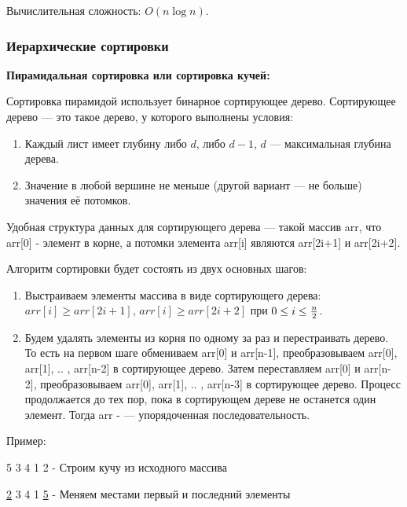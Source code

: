 \documentclass[12pt]{matmex-diploma}
\begin{document}
            Вычислительная сложность: $O(n \log n)$.
            
        \subsubsection*{Иерархические сортировки}
            
            \textbf{Пирамидальная сортировка или сортировка кучей:}
            
            Сортировка пирамидой использует бинарное сортирующее дерево. Сортирующее дерево — это такое дерево, у которого выполнены условия:
            \begin{enumerate}
                \item Каждый лист имеет глубину либо $d$, либо $d-1$, $d$ — максимальная глубина дерева.
                \item Значение в любой вершине не меньше (другой вариант — не больше) значения её потомков.
            \end{enumerate}
            
            Удобная структура данных для сортирующего дерева — такой массив arr, что arr[0] - элемент в корне, а потомки элемента arr[i] являются arr[2i+1] и arr[2i+2].
            
            Алгоритм сортировки будет состоять из двух основных шагов:
            \begin{enumerate}
                \item Выстраиваем элементы массива в виде сортирующего дерева: $arr[i] \geq arr[2i+1]$, $arr[i] \geq arr[2i+2]$ при $0 \leq i \leq {n \over 2}$. 
                \item Будем удалять элементы из корня по одному за раз и перестраивать дерево. То есть на первом шаге обмениваем arr[0] и arr[n-1], преобразовываем arr[0], arr[1], .. , arr[n-2] в сортирующее дерево. Затем переставляем arr[0] и arr[n-2], преобразовываем arr[0], arr[1], .. , arr[n-3] в сортирующее дерево. Процесс продолжается до тех пор, пока в сортирующем дереве не останется один элемент. Тогда arr - — упорядоченная последовательность.
            \end{enumerate}
            
            Пример:
            
            5 3 4 1 2   - Строим кучу из исходного массива
            
            \underline{2} 3 4 1 \underline{5}   - Меняем местами первый и последний элементы
            
\end{document}
